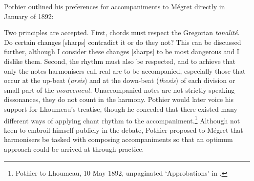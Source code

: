Pothier outlined his preferences for accompaniments to Mégret directly in January of 1892:

  {}
{Two principles are accepted. First, chords must respect the Gregorian \emph{tonalité}. Do certain changes [sharps] contradict it or do they not? This can be discussed further, although I consider these changes [sharps] to be most dangerous and I dislike them. Second, the rhythm must also be respected, and to achieve that only the notes harmonisers call real are to be accompanied, especially those that occur at the up-beat (\emph{arsis}) and at the down-beat (\emph{thesis}) of each division or small part of the \emph{mouvement}. Unaccompanied notes are not strictly speaking dissonances, they do not count in the harmony.}
\noindent
Pothier would later voice his support for Lhoumeau's treatise, though he conceded that there existed many different ways of applying chant rhythm to the accompaniment.\footnote{Pothier to Lhoumeau, 10 May 1892, unpaginated `Approbations' in \cite{LhoumeauRhythmeexecutionaccompagnement1892}.}
Although not keen to embroil himself publicly in the debate, Pothier proposed to Mégret that harmonisers be tasked with composing accompaniments so that an optimum approach could be arrived at through practice.

